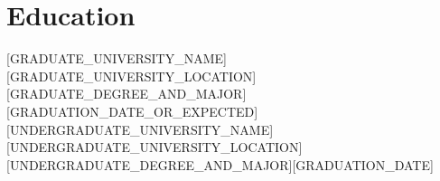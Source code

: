 ﻿%
\section{Education}
\resumeSubHeadingListStart
  \resumeSubheading
    {[GRADUATE\_UNIVERSITY\_NAME]}{[GRADUATE\_UNIVERSITY\_LOCATION]}
    {[GRADUATE\_DEGREE\_AND\_MAJOR]}{[GRADUATION\_DATE\_OR\_EXPECTED]}
  \resumeSubheading
    {[UNDERGRADUATE\_UNIVERSITY\_NAME]}{[UNDERGRADUATE\_UNIVERSITY\_LOCATION]}
    {[UNDERGRADUATE\_DEGREE\_AND\_MAJOR]}{[GRADUATION\_DATE]}
\resumeSubHeadingListEnd
